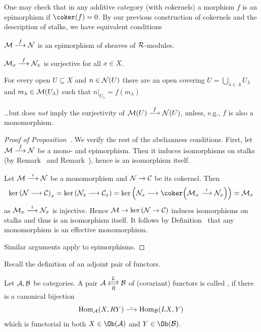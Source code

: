\documentclass[a4paper,parskip=half,numbers=enddot, DIV=12]{scrreprt}
\begin{document}
\begin{rem}
	One may check that in any additive category (with cokernels) a morphism $f$ is an epimorphism if $\coker(f)=0$. By our previous construction of cokernels and the description of stalks, we have equivalent conditions
	\begin{alphanumerate}
		\item $\Mm\morphism[f]\Nn$ is an epimorphism of sheaves of $\mathcal{R}$-modules.
		\item $\Mm_x\morphism[f]\Nn_x$ is surjective for all $x\in X$.
		\item For every open $U\subseteq X$ and $n\in\mathcal{N}(U)$ there are an open covering $U=\bigcup_{\lambda\in\Lambda}U_\lambda$ and $m_\lambda\in\mathcal{M}(U_\lambda)$ such that $n|_{U_\lambda}=f(m_\lambda)$
	\end{alphanumerate}
	\ldots but  does \emph{not} imply the surjectivity of $\Mm(U)\morphism[f]\Nn(U)$, unless, e.g., $f$ is also a monomorphism.
\end{rem}
\begin{proof}[Proof of Proposition~]
	We verify the rest of the abelianness conditions. First, let $\Mm\morphism[f]\Nn$ be a mono- and epimorphism. Then it induces isomorphisms on stalks (by Remark~ and Remark~), hence is an isomorphism itself.
	
	Let $\Mm\morphism[i]\Nn$ be a monomorphism and $\Nn\morphism\Cc$ be its cokernel. Then 
	\begin{align*}
		\ker\left(\Nn\morphism\Cc\right)_x=\ker\left(\Nn_x\morphism\Cc_x\right)=\ker\left(\Nn_x\morphism\coker\Big(\Mm_x\morphism[i]\Nn_x\Big)\right)\simeq\Mm_x
	\end{align*}
	as $\Mm_x\morphism[i]\Nn_x$ is injective. Hence $\Mm\morphism\ker\left(\Nn\morphism\Cc\right)$ induces isomorphisms on stalks and thus is an isomorphism itself. It follows by Definition~ that any monomorphism is an effective monomorphism.
	
	Similar arguments apply to epimorphisms.	
\end{proof}
Recall the definition of an adjoint pair of functors.
\begin{defi}
	Let $\mathcal{A},\mathcal{B}$ be categories. A pair $\Aa\doublelrmorphism[L][\smash{R}]\Bb$ of (covariant) functors is called , if there is a canonical bijection
	\begin{align*}
		\Hom_\Aa(X,RY)\isomorphism\Hom_\Bb(LX,Y)
	\end{align*}
	which is functorial in both $X\in\Ob(\Aa)$ and $Y\in\Ob(\Bb)$.
\end{defi}
\end{document}
